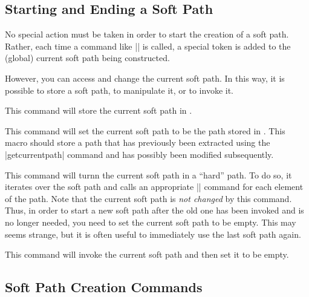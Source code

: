 \subsection{Starting and Ending a Soft Path}

No special action must be taken in order to start the creation of a
soft path. Rather, each time a command like |\pgfsyssoftpath@lineto|
is called, a special token is added to the (global) current soft path
being constructed.

However, you can access and change the current soft path. In this way,
it is possible to store a soft path, to manipulate it, or to invoke
it.

\begin{command}{\pgfsyssoftpath@getcurrentpath{}}
  This command will store the current soft path in .
\end{command}

\begin{command}{\pgfsyssoftpath@setcurrentpath{}}
  This command will set the current soft path to be the path stored in
  . This macro should store a path that has
  previously been extracted using the |getcurrentpath| command and has
  possibly been modified subsequently.
\end{command}

\begin{command}{\pgfsyssoftpath@invokecurrentpath}
  This command will turnn the current soft path in a ``hard'' path. To
  do so, it iterates over the soft path and calls an appropriate
  |\pgfsys@xxxx| command for each element of the path. Note that the
  current soft path is \emph{not changed} by this command. Thus, in
  order to start a new soft path after the old one has been invoked
  and is no longer needed, you need to set the current soft path to be
  empty. This may seems strange, but it is often useful to immediately
  use the last soft path again.
\end{command}

\begin{command}{\pgfsyssoftpath@flushcurrentpath}
  This command will invoke the current soft path and then set it to be
  empty. 
\end{command}



\subsection{Soft Path Creation Commands}

